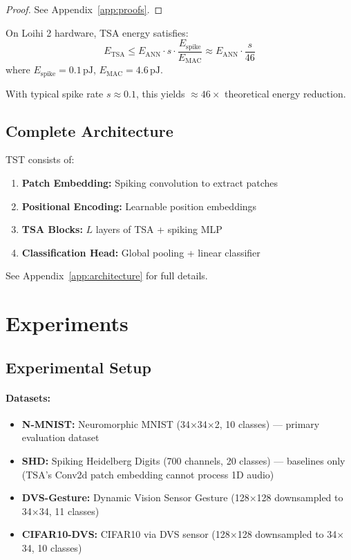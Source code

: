 \documentclass{article}
\begin{document}
\begin{proof}
See Appendix~\ref{app:proofs}.
\end{proof}

\begin{theorem}
\label{thm:energy}
On Loihi 2 hardware, TSA energy satisfies:
\begin{equation}
    E_{\text{TSA}} \leq E_{\text{ANN}} \cdot s \cdot \frac{E_{\text{spike}}}{E_{\text{MAC}}} \approx E_{\text{ANN}} \cdot \frac{s}{46}
\end{equation}
where $E_{\text{spike}} = 0.1\,\text{pJ}$, $E_{\text{MAC}} = 4.6\,\text{pJ}$.
\end{theorem}

With typical spike rate $s \approx 0.1$, this yields $\approx 46\times$ theoretical energy reduction.

\subsection{Complete Architecture}

TST consists of:
\begin{enumerate}
    \item \textbf{Patch Embedding:} Spiking convolution to extract patches
    \item \textbf{Positional Encoding:} Learnable position embeddings
    \item \textbf{TSA Blocks:} $L$ layers of TSA + spiking MLP
    \item \textbf{Classification Head:} Global pooling + linear classifier
\end{enumerate}

See Appendix~\ref{app:architecture} for full details.

\section{Experiments}

\subsection{Experimental Setup}

\paragraph{Datasets:}
\begin{itemize}
    \item \textbf{N-MNIST:} Neuromorphic MNIST (34×34×2, 10 classes) --- primary evaluation dataset
    \item \textbf{SHD:} Spiking Heidelberg Digits (700 channels, 20 classes) --- baselines only (TSA's Conv2d patch embedding cannot process 1D audio)
    \item \textbf{DVS-Gesture:} Dynamic Vision Sensor Gesture (128$\times$128 downsampled to 34$\times$34, 11 classes)
    \item \textbf{CIFAR10-DVS:} CIFAR10 via DVS sensor (128$\times$128 downsampled to 34$\times$34, 10 classes)
\end{itemize}
\end{document}
